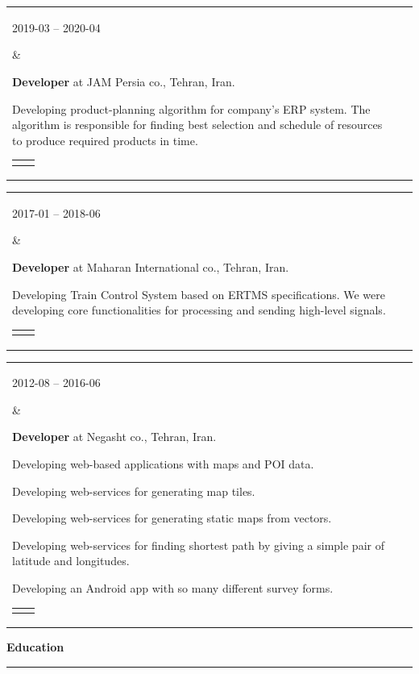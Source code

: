 \documentclass[11pt,a4paper,oneside]{article}
\makeatletter
\newcommand{\prog}{Programming Lang.:}
\newcommand{\os}{Operating System:}
\newcommand{\vcs}{Version Controls:}
\newcommand{\issue}{Issue Tracking:}
\renewcommand{\section}[1]{%
{\large\textbf{#1}}\\
\rule[9pt]{18cm}{.4pt}\vspace{-15pt}%
}
\newenvironment{mytable}{%
\begin{tabular}{@{}l@{\hspace{4mm}}l@{}}%
}{\end{tabular}}
\newcommand{\myitem}[2]{%
\parbox[t]{16mm}{#1}&\parbox[t]{16cm}{#2}\\%
}
\newenvironment{innertable}{%
\begin{tabular}{@{}l@{\hspace{5mm}}l@{}}%
}{\end{tabular}}
\newcommand{\inneritem}[2]{%
\parbox{35mm}{{\color{darkgray}#1}}&\parbox{12cm}{#2}\\%
}
\makeatother
\begin{document}
\begin{mytable}
\myitem{2019-03 -- 2020-04}{%
\textbf{Developer} at
JAM Persia co., Tehran, Iran.

Developing product-planning algorithm for company's ERP system.
The algorithm is responsible for finding best selection and
schedule of resources to produce required products in time.

\begin{innertable}
\inneritem{\prog}{C\#}
\inneritem{\os}{Windows}
\inneritem{\vcs}{SVN}
\inneritem{\issue}{Jira}
\end{innertable}
}
\end{mytable}

\begin{mytable}
\myitem{2017-01 -- 2018-06}{
\textbf{Developer} at
Maharan International co., Tehran, Iran.

Developing Train Control System based on ERTMS specifications.
We were developing core functionalities for processing and
sending high-level signals.

\begin{innertable}
\inneritem{\prog}{C with Frama-C}
\inneritem{\os}{Windows}
\inneritem{\vcs}{TFS}
\inneritem{\issue}{Microsoft Project}
\end{innertable}
}
\end{mytable}

\begin{mytable}
\myitem{2012-08 -- 2016-06}{
\textbf{Developer} at
Negasht co., Tehran, Iran.

Developing web-based applications with maps and POI data.

Developing web-services for generating map tiles.

Developing web-services for generating static maps from vectors.

Developing web-services for finding shortest path by giving a
simple pair of latitude and longitudes.

Developing an Android app with so many different survey forms.

\begin{innertable}
\inneritem{\prog}{C\#, JavaScript, C++, und Java}
\inneritem{\os}{Windows}
\inneritem{\vcs}{Microsoft Visual SourceSafe}
\inneritem{\issue}{Company-specific issue tracker}
\end{innertable}
}
\end{mytable}

\section{Education}
\end{document}
